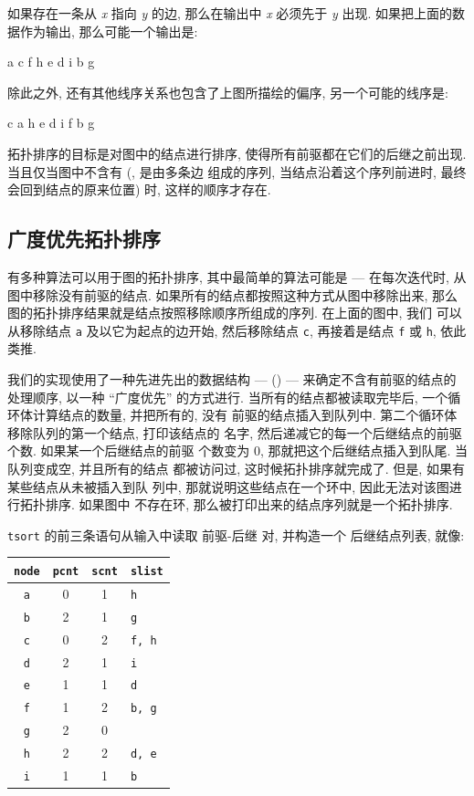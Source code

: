 如果存在一条从 \textit{x} 指向 \textit{y} 的边, 那么在输出中 \textit{x}
必须先于 \textit{y} 出现. 如果把上面的数据作为输出, 那么可能一个输出是:
\begin{file}
    a c f h e d i b g
\end{file}
除此之外, 还有其他线序关系也包含了上图所描绘的偏序, 另一个可能的线序是:
\begin{file}
    c a h e d i f b g
\end{file}

拓扑排序的目标是对图中的结点进行排序, 使得所有前驱都在它们的后继之前出现.
 当且仅当图中不含有  (, 是由多条边
组成的序列, 当结点沿着这个序列前进时, 最终会回到结点的原来位置) 时, 
这样的顺序才存在.

\subsection{广度优先拓扑排序}
\label{subsec:breadth_first_topological_sort}

有多种算法可以用于图的拓扑排序, 其中最简单的算法可能是 --- 在每次迭代时,
从图中移除没有前驱的结点. 如果所有的结点都按照这种方式从图中移除出来,
那么图的拓扑排序结果就是结点按照移除顺序所组成的序列. 在上面的图中, 我们 
可以从移除结点 \texttt{a} 及以它为起点的边开始, 然后移除结点 \texttt{c},
再接着是结点 \texttt{f} 或 \texttt{h}, 依此类推.

我们的实现使用了一种先进先出的数据结构 ---  () ---
来确定不含有前驱的结点的处理顺序, 以一种 ``广度优先'' 的方式进行.
当所有的结点都被读取完毕后, 一个循环体计算结点的数量, 并把所有的, 没有 
前驱的结点插入到队列中. 第二个循环体移除队列的第一个结点, 打印该结点的
名字, 然后递减它的每一个后继结点的前驱个数. 如果某一个后继结点的前驱
个数变为 0, 那就把这个后继结点插入到队尾. 当队列变成空, 并且所有的结点
都被访问过, 这时候拓扑排序就完成了. 但是, 如果有某些结点从未被插入到队
列中, 那就说明这些结点在一个环中, 因此无法对该图进行拓扑排序. 如果图中
不存在环, 那么被打印出来的结点序列就是一个拓扑排序.

\texttt{tsort} 的前三条语句从输入中读取 \mbox{前驱}-后继 对, 并构造一个
后继结点列表, 就像:
\begin{tabular}{c|c|c|l}
    \hline
    \hline
    \texttt{node}  & \texttt{pcnt} & \texttt{scnt} & \texttt{slist} \\
    \hline
    \texttt{a}  & 0 & 1 & \texttt{h} \\
    \texttt{b}  & 2 & 1 & \texttt{g} \\
    \texttt{c}  & 0 & 2 & \texttt{f, h} \\
    \texttt{d}  & 2 & 1 & \texttt{i} \\
    \texttt{e}  & 1 & 1 & \texttt{d} \\
    \texttt{f}  & 1 & 2 & \texttt{b, g} \\
    \texttt{g}  & 2 & 0 &  \\
    \texttt{h}  & 2 & 2 & \texttt{d, e}  \\
    \texttt{i}  & 1 & 1 & \texttt{b}  \\
    \hline
\end{tabular}

